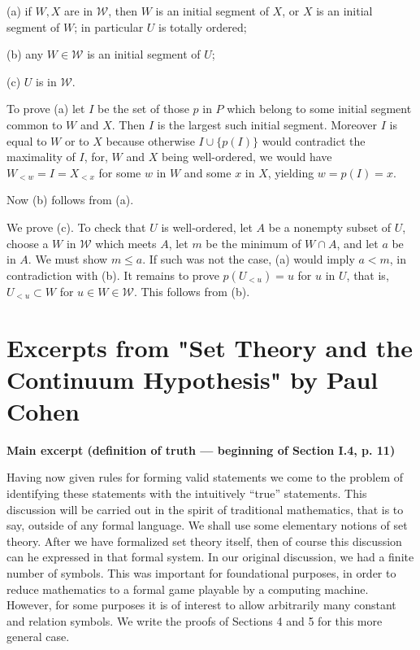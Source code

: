 \documentclass[12pt]{article}
\begin{document}
(a) if $W,X$ are in $\mathcal W$, then $W$ is an initial segment of $X$, or $X$ is an initial segment of $W$; in particular $U$ is totally ordered;

(b) any $W\in\mathcal W$ is an initial segment of $U$; 

(c) $U$ is in $\mathcal W$.

To prove (a) let $I$ be the set of those $p$ in $P$ which belong to some initial segment common to $W$ and $X$. Then $I$ is the largest such initial segment. Moreover $I$ is equal to $W$ or to $X$ because otherwise $I\cup\{p(I)\}$ would contradict the maximality of $I$, for, $W$ and $X$ being well-ordered, we would have $W_{<w}=I=X_{<x}$ for some $w$ in $W$ and some $x$ in $X$, yielding $w=p(I)=x$. 

Now (b) follows from (a). 

We prove (c). To check that $U$ is well-ordered, let $A$ be a nonempty subset of $U$, choose a $W$ in $\mathcal W$ which meets $A$, let $m$ be the minimum of $W\cap A$, and let $a$ be in $A$. We must show $m\le a$. If such was not the case, (a) would imply $a<m$, in contradiction with (b). It remains to prove $p(U_{<u})=u$ for $u$ in $U$, that is, $U_{<u}\subset W$ for $u\in W\in\mathcal W$. This follows from (b). 

\newpage 

\section{Excerpts from "Set Theory and the Continuum Hypothesis" by Paul Cohen} 

\centerline{\textbf{Main excerpt (definition of truth --- beginning of Section I.4, p. 11)}}

Having now given rules for forming valid statements we come to the problem of identifying these statements with the intuitively ``true'' statements. This discussion will be carried out in the spirit of traditional mathematics, that is to say, outside of any formal language. We shall use some elementary notions of set theory. After we have formalized set theory itself, then of course this discussion can he expressed in that formal system. In our original discussion, we had a finite number of symbols. This was important for foundational purposes, in order to reduce mathematics to a formal game playable by a computing machine. However, for some purposes it is of interest to allow arbitrarily many constant and relation symbols. We write the proofs of Sections 4 and 5 for this more general case.
\end{document}
